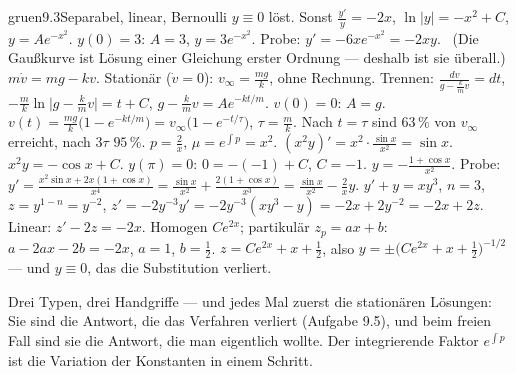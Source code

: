 \begin{loesungkarte}{gruen}{9.3}{Separabel, linear, Bernoulli}
$y\equiv0$ löst. Sonst $\frac{y'}y = -2x$, $\ln|y| = -x^{2} + C$, $y = Ae^{-x^{2}}$. $y(0) = 3$: $A = 3$, $y = 3e^{-x^{2}}$. Probe: $y' = -6xe^{-x^{2}} = -2xy$. \checkmark\ (Die Gaußkurve ist Lösung einer Gleichung erster Ordnung --- deshalb ist sie überall.)
$m\dot v = mg - kv$. Stationär ($\dot v = 0$): $v_\infty = \frac{mg}k$, ohne Rechnung. Trennen: $\frac{dv}{g - \frac kmv} = dt$, $-\frac mk\ln\bigl|g - \tfrac kmv\bigr| = t + C$, $g - \frac kmv = Ae^{-kt/m}$. $v(0) = 0$: $A = g$. $v(t) = \frac{mg}k\bigl(1 - e^{-kt/m}\bigr) = v_\infty\bigl(1 - e^{-t/\tau}\bigr)$, $\tau = \frac mk$. Nach $t = \tau$ sind $63\,\%$ von $v_\infty$ erreicht, nach $3\tau$ $95\,\%$.
$p = \frac2x$, $\mu = e^{\int p} = x^{2}$. $(x^{2}y)' = x^{2}\cdot\frac{\sin x}{x^{2}} = \sin x$. $x^{2}y = -\cos x + C$. $y(\pi) = 0$: $0 = -(-1) + C$, $C = -1$. $y = -\frac{1 + \cos x}{x^{2}}$. Probe: $y' = \frac{x^{2}\sin x + 2x(1 + \cos x)}{x^{4}} = \frac{\sin x}{x^{2}} + \frac{2(1 + \cos x)}{x^{3}} = \frac{\sin x}{x^{2}} - \frac2xy$. \checkmark
{}
$y' + y = xy^{3}$, $n = 3$, $z = y^{1 - n} = y^{-2}$, $z' = -2y^{-3}y' = -2y^{-3}(xy^{3} - y) = -2x + 2y^{-2} = -2x + 2z$. Linear: $z' - 2z = -2x$. Homogen $Ce^{2x}$; partikulär $z_p = ax + b$: $a - 2ax - 2b = -2x$, $a = 1$, $b = \frac12$. $z = Ce^{2x} + x + \frac12$, also $y = \pm\bigl(Ce^{2x} + x + \tfrac12\bigr)^{-1/2}$ --- und $y\equiv0$, das die Substitution verliert.
\begin{mitnehmen}\kastentext
Drei Typen, drei Handgriffe --- und jedes Mal zuerst die stationären Lösungen: Sie sind die Antwort, die das Verfahren verliert (Aufgabe 9.5), und beim freien Fall sind sie die Antwort, die man eigentlich wollte. Der integrierende Faktor $e^{\int p}$ ist die Variation der Konstanten in einem Schritt.
\end{mitnehmen}
\end{loesungkarte}

